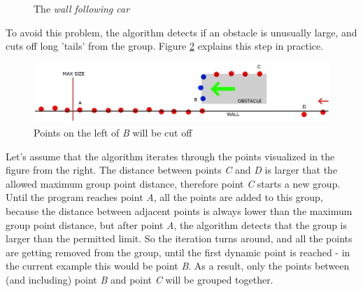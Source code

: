 \begin{figure}[!ht]
    \centering
    \caption{The \textit{wall following car}}
    \label{wall_following_car}
\end{figure}

To avoid this problem, the algorithm detects if an obstacle is unusually large, and cuts off long 'tails' from the group. Figure \ref{group_cutting} explains this step in practice.

\begin{figure}[!ht]
    \centering
    \includegraphics[width=\textwidth]{figures/raw/jpeg/group_cutting.jpg}
    \caption{Points on the left of \textit{B} will be cut off}
    \label{group_cutting}
\end{figure}

Let's assume that the algorithm iterates through the points visualized in the figure from the right. The distance between points \textit{C} and \textit{D} is larger that the allowed maximum group point distance, therefore point \textit{C} starts a new group. Until the program reaches point \textit{A}, all the points are added to this group, because the distance between adjacent points is always lower than the maximum group point distance, but after point \textit{A}, the algorithm detects that the group is larger than the permitted limit. So the iteration turns around, and all the points are getting removed from the group, until the first dynamic point is reached - in the current example this would be point \textit{B}. As a result, only the points between (and including) point \textit{B} and point \textit{C} will be grouped together.

